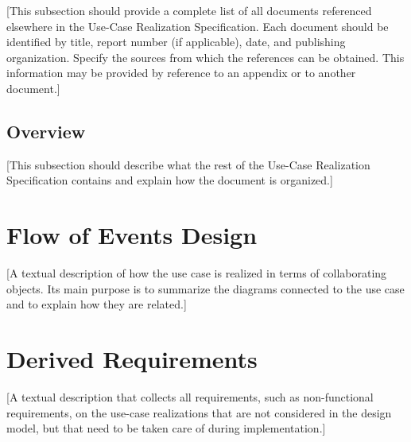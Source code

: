 \documentclass[a4paper,twoside]{article}
\begin{document}
[This subsection should provide a complete list of all
documents referenced elsewhere in the Use-Case Realization Specification.
Each document should be identified by title,
report number (if applicable), date, and publishing organization. Specify the sources from which the
references can be obtained. This information may be provided by reference to an
appendix or to another document.]

\subsection{Overview}

[This subsection should describe what the rest of the Use-Case
Realization Specification contains and explain how the document is
organized.]

\section{Flow of Events Design}

[A textual description of how the use case is realized in
terms of collaborating objects. Its main purpose is to summarize the diagrams
connected to the use case and to explain how they are related.]

\section{Derived Requirements}

[A textual description that collects all requirements, such
as non-functional requirements, on the use-case realizations that are not
considered in the design model, but that need to be taken care of during
implementation.]
\end{document}
